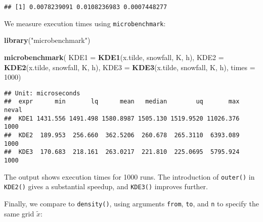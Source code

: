 \documentclass[
  a4paper,
]{article}
\newenvironment{Shaded}{\begin{snugshade}}{\end{snugshade}}
\newcommand{\AttributeTok}[1]{\textcolor[rgb]{0.13,0.29,0.53}{#1}}
\newcommand{\ControlFlowTok}[1]{\textcolor[rgb]{0.13,0.29,0.53}{\textbf{#1}}}
\newcommand{\DecValTok}[1]{\textcolor[rgb]{0.00,0.00,0.81}{#1}}
\newcommand{\FunctionTok}[1]{\textcolor[rgb]{0.13,0.29,0.53}{\textbf{#1}}}
\newcommand{\NormalTok}[1]{#1}
\newcommand{\OtherTok}[1]{\textcolor[rgb]{0.56,0.35,0.01}{#1}}
\newcommand{\SpecialCharTok}[1]{\textcolor[rgb]{0.81,0.36,0.00}{\textbf{#1}}}
\newcommand{\StringTok}[1]{\textcolor[rgb]{0.31,0.60,0.02}{#1}}
\theoremstyle{definition}
\theoremstyle{definition}
\theoremstyle{definition}
\theoremstyle{definition}
\theoremstyle{remark}
\begin{document}
\begin{verbatim}
## [1] 0.0078239091 0.0108236983 0.0007448277
\end{verbatim}

We measure execution times using \texttt{microbenchmark}:

\begin{Shaded}
\begin{Highlighting}[]
\FunctionTok{library}\NormalTok{(}\StringTok{"microbenchmark"}\NormalTok{)}

\FunctionTok{microbenchmark}\NormalTok{(}
  \AttributeTok{KDE1 =} \FunctionTok{KDE1}\NormalTok{(x.tilde, snowfall, K, h),}
  \AttributeTok{KDE2 =} \FunctionTok{KDE2}\NormalTok{(x.tilde, snowfall, K, h),}
  \AttributeTok{KDE3 =} \FunctionTok{KDE3}\NormalTok{(x.tilde, snowfall, K, h),}
  \AttributeTok{times =} \DecValTok{1000}\NormalTok{)}
\end{Highlighting}
\end{Shaded}

\begin{verbatim}
## Unit: microseconds
##  expr      min       lq      mean   median        uq       max neval
##  KDE1 1431.556 1491.498 1580.8987 1505.130 1519.9520 11026.376  1000
##  KDE2  189.953  256.660  362.5206  260.678  265.3110  6393.089  1000
##  KDE3  170.683  218.161  263.0217  221.810  225.0695  5795.924  1000
\end{verbatim}

The output shows execution times for 1000 runs. The introduction
of \texttt{outer()} in \texttt{KDE2()} gives a substantial speedup, and \texttt{KDE3()} improves further.

Finally, we compare to \texttt{density()}, using arguments \texttt{from}, \texttt{to}, and \texttt{n}
to specify the same grid \(\tilde x\):

\begin{Shaded}
\end{Shaded}
\end{document}
